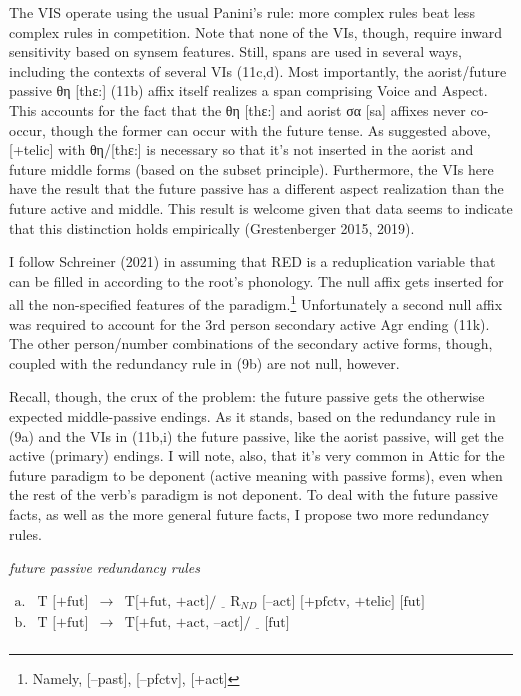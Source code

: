 \documentclass[]{ling-200b-2}
\begin{document}
\noindent \hfill \par
The VIS operate using the usual Panini's rule: more complex rules beat less complex rules in competition. Note that none of the VIs, though, require inward sensitivity based on synsem features. Still, spans are used in several ways, including the contexts of several VIs (11c,d). Most importantly, the aorist/future passive θη [t\super hε:] (11b) affix itself realizes a span comprising Voice and Aspect. This accounts for the fact that the θη [t\super hε:] and aorist σα [sa] affixes never co-occur, though the former can occur with the future tense. As suggested above, [+telic] with θη/[t\super hε:] is necessary so that it's not inserted in the aorist and future middle forms (based on the subset principle). Furthermore, the VIs here have the result that the future passive has a different aspect realization than the future active and middle. This result is welcome given that data seems to indicate that this distinction holds empirically (Grestenberger 2015, 2019).


I follow Schreiner (2021) in assuming that RED is a reduplication variable that can be filled in according to the root's phonology. The null affix gets inserted for all the non-specified features of the paradigm.\footnote{Namely, [--past], [--pfctv], [+act]} Unfortunately a second null affix was required to account for the 3rd person secondary active Agr ending (11k). The other person/number combinations of the secondary active forms, though, coupled with the redundancy rule in (9b) are not null, however.

Recall, though, the crux of the problem: the future passive gets the otherwise expected middle-passive endings. As it stands, based on the redundancy rule in (9a) and the VIs in (11b,i) the future passive, like the aorist passive, will get the active (primary) endings. I will note, also, that it's very common in Attic for the future paradigm to be deponent (active meaning with passive forms), even when the rest of the verb's paradigm is not deponent. To deal with the future passive facts, as well as the more general future facts, I propose two more redundancy rules.

\noindent \hfill \par
\ex \textit{future passive redundancy rules}

\begin{math}
\begin{array}{llll}
    \textrm{a.} & \textrm{T [+fut]} & \rightarrow & \textrm{T[+fut, +act]} / \underline{\hspace{1em}} \textrm{R$_{ND}$ [--act] [+pfctv, +telic] [fut]} \\
    \textrm{b.} & \textrm{T [+fut]} & \rightarrow & \textrm{T[+fut, +act, --act]} / \underline{\hspace{1em}} \textrm{[fut]} \\
\end{array}
\end{math}
\xe
\end{document}
